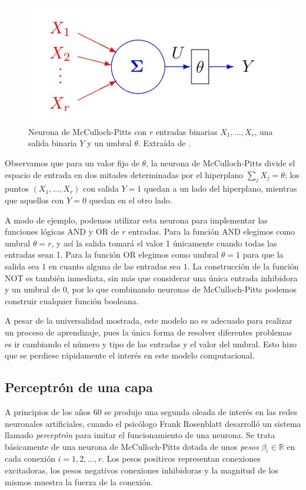 \documentclass[
  a4paper,
  12pt,
  spanish,
]{scrartcl}
\theoremstyle{teorema-style}
\begin{document}
\begin{figure}[h]
  \centering
  \includegraphics[width=.7\textwidth]{img/mcculloch-pitts}
  \caption{Neurona de McCulloch-Pitts con $r$ entradas binarias $X_1,\dots,X_r$, una salida binaria $Y$ y un umbral $\theta$. Extraída de \parencite{izenman_modern_2008}.}
  \label{fig:mcculloch-pitts}
\end{figure}

Observamos que para un valor fijo de $\theta$, la neurona de McCulloch-Pitts divide el espacio de entrada en dos mitades determinadas por el hiperplano $\sum_j X_j = \theta$; los puntos $(X_1, \dots, X_r)$ con salida $Y=1$ quedan a un lado del hiperplano, mientras que aquellos con $Y=0$ quedan en el otro lado.

A modo de ejemplo, podemos utilizar esta neurona para implementar las funciones lógicas AND y OR de $r$ entradas. Para la función AND elegimos como umbral $\theta = r$, y así la salida tomará el valor 1 únicamente cuando todas las entradas sean 1. Para la función OR elegimos como umbral $\theta = 1$ para que la salida sea $1$ en cuanto alguna de las entradas sea $1$. La construcción de la función NOT es también inmediata, sin más que considerar una única entrada inhibidora y un umbral de $0$, por lo que combinando neuronas de McCulloch-Pitts podemos construir cualquier función booleana.

A pesar de la universalidad mostrada, este modelo no es adecuado para realizar un proceso de aprendizaje, pues la única forma de resolver diferentes problemas es ir cambiando el número y tipo de las entradas y el valor del umbral. Esto hizo que se perdiese rápidamente el interés en este modelo computacional.

\subsection{Perceptrón de una capa}

A principios de los años 60 se produjo una segunda oleada de interés en las redes neuronales artificiales, cuando el psicólogo Frank Rosenblatt desarrolló un sistema llamado \textit{perceptrón} \parencite{rosenblatt_perceptron_1958} para imitar el funcionamiento de una neurona. Se trata básicamente de una neurona de McCulloch-Pitts dotada de unos \textit{pesos} $\beta_i \in \mathbb{R}$ en cada conexión $i=1,2,\dots, r$. Los pesos positivos representan conexiones excitadoras, los pesos negativos conexiones inhibidoras y la magnitud de los mismos muestra la fuerza de la conexión.
\end{document}
